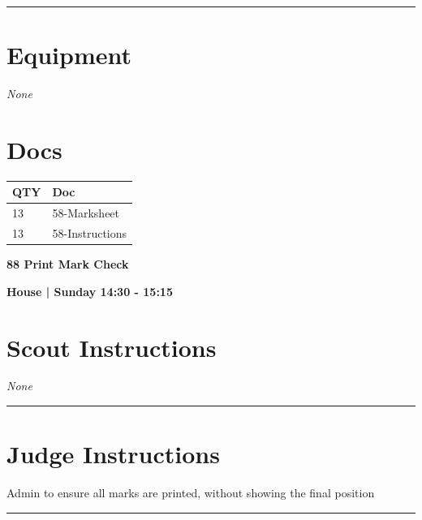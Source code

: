 \documentclass[10pt]{article}
\newcommand{\newtitle}[1]{\begin{center}{\Huge\bfseries #1 }\\ \vspace{5mm}\end{center}}
\newcommand{\newsubtitle}[1]{\begin{center}{\color{grey}\Large\bfseries #1 }\\ \vspace{5mm}\end{center}}
\begin{document}
			\vspace{0.5cm}
	\hrule
	\vspace{0.5cm}

	\begin{multicols}{2}

		\section*{\faWrench \: Equipment}

				\textit{None}
		
		\vfill\null
		\columnbreak

			\section*{\faFile \: Docs}
		 	\begin{center}
			\begin{tabular}{p{2cm}p{4cm}}

			\textbf{QTY} & \textbf{Doc} \\\toprule
										13&58-Marksheet\\\midrule
										13&58-Instructions\\\midrule
							\end{tabular}
			\end{center}
	

		\vfill\null

		\end{multicols}



	\vspace{1cm}


	\clearpage
		\newtitle{88 Print Mark Check }
	\newsubtitle{House | Sunday 14:30 - 15:15}
		\setcounter{section}{87}
	\section*{Scout Instructions}
		\textit{None}
	
	\vspace{0.5cm}
	\hrule
	\vspace{0.5cm}

		\section*{Judge Instructions}
		Admin to ensure all marks are printed, without showing the final position
\vspace{0.5cm}
	\hrule
	\vspace{0.5cm}
\end{document}

